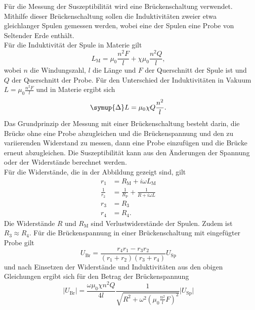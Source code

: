     Für die Messung der Suszeptibilität wird eine Brückenschaltung verwendet.
    Mithilfe dieser Brückenschaltung sollen die Induktivitäten zweier etwa gleichlanger Spulen gemessen werden,
    wobei eine der Spulen eine Probe von Seltender Erde enthält.\\
    Für die Induktivität der Spule in Materie gilt
    \begin{equation}
        L_\text{M} = \mu_0 \frac{n^2 F}{l} + \chi \mu_0 \frac{n^2 Q}{l} ,
    \end{equation}
    wobei $n$ die Windungszahl, $l$ die Länge und $F$ der Querschnitt der Spule ist und $Q$ der Querschnitt der Probe.
    Für den Unterschied der Induktivitäten in Vakuum $L = \mu_0 \frac{n^2 F}{l}$ und in Materie ergibt sich
    \begin{equation}
        \symup{\Delta} L = \mu_0 \chi Q \frac{n^2}{l} .
    \end{equation}
    Das Grundprinzip der Messung mit einer Brückenschaltung besteht darin,
    die Brücke ohne eine Probe abzugleichen und die Brückenspannung und den zu variierenden Widerstand zu messen,
    dann eine Probe einzufügen und die Brücke erneut abzugleichen.
    Die Suszeptibilität kann aus den Änderungen der Spannung oder der Widerstände berechnet werden.\\
    Für die Widerstände, 
    die in der Abbildung %
    gezeigt sind, gilt
    \begin{align} %
        r_1 &= R_\text{M} + i \omega L_\text{M} \\ 
        \frac{1}{r_2} &= \frac{1}{R_\text{P}} + \frac{1}{R + i \omega L} \\ 
        r_3 &= R_3 \\ 
        r_4 &= R_4 .   
    \end{align}
    Die Widerstände $R$ und $R_\text{M}$ sind Verlustwiderstände der Spulen.
    Zudem ist $R_3 \approx R_4$.
    Für die Brückenspannung in einer Brückenschaltung mit eingefügter Probe gilt
    \begin{equation}
        U_\text{Br} = \frac{r_4 r_1 - r_3 r_2}{(r_1 + r_2)(r_3 + r_4)} U_\text{Sp} %
    \end{equation}
    und nach Einsetzen der Widerstände und Induktivitäten aus den obigen Gleichungen ergibt sich für den Betrag der Brückenspannung
    \begin{equation}
        \lvert U_\text{Br} \rvert = \frac{\omega \mu_0 \chi n^2 Q}{4l} \frac{1}{\sqrt{R^2 + {\omega}^2(\mu_0 \frac{n^2}{l}F)^2}} \lvert U_\text{Sp} \rvert 
    \end{equation} 

